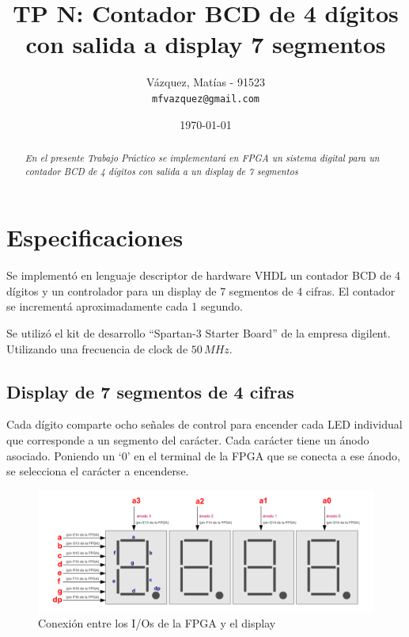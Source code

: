 \documentclass[10pt,spanish,a4paper,openany,notitlepage]{article}
\begin{document}
\title{\textbf{TP N: Contador BCD de 4 dígitos con salida a display 7 segmentos}}
\author{
 Vázquez, Matías - 91523\\
 \texttt{mfvazquez@gmail.com}
}
\date{\today}
\maketitle

\begin{abstract} %
\emph{En el presente Trabajo Práctico se implementará en FPGA un sistema
digital para un contador BCD de 4 dígitos con salida a un display de 
7 segmentos}
\end{abstract}

\section{Especificaciones}

Se implementó en lenguaje descriptor de hardware VHDL un contador BCD de
4 dígitos y un controlador para un display de 7 segmentos de 4 cifras. El
contador se incrementá aproximadamente cada 1 segundo.

Se utilizó el kit de desarrollo ``Spartan-3 Starter Board'' de la empresa
digilent. Utilizando una frecuencia de clock de $50\, \unit{MHz}$.

\subsection{Display de 7 segmentos de 4 cifras}

Cada dígito comparte ocho señales de control para encender cada LED individual
que corresponde a un segmento del carácter. Cada carácter tiene
un ánodo asociado. Poniendo un `0' en el terminal de la FPGA que se 
conecta a ese ánodo, se selecciona el carácter a encenderse.

\begin{figure}[H] %
\begin{center}
\includegraphics[scale=0.4]{./imagenes/display.png}
\caption{Conexión entre los I/Os de la FPGA y el display}
 \label{fig:display}
\end{center}
\end{figure}
\end{document}
